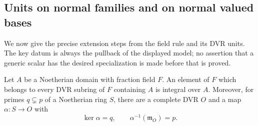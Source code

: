 \subsection{Units on normal families and on normal valued bases}
\label{subsec:ftb-key-normal-family-units}

We now give the precise extension steps from the field rule and
its DVR units.  The key datum is always the pullback of the
displayed model; no assertion that a generic scalar has the
desired specialization is made before that is proved.

\begin{srlemma}
\label{lem:ftb-key-dvr-tests}
Let \(A\) be a Noetherian domain with fraction field \(F\).
An element of \(F\) which belongs to every DVR subring of \(F\)
containing \(A\) is integral over \(A\).
Moreover, for primes \(q\subsetneq p\) of a Noetherian ring \(S\),
there are a complete DVR \(O\) and a map \(\alpha:S\to O\) with
\[
                 \ker\alpha=q,\qquad
                 \alpha^{-1}(\mathfrak m_O)=p.
 \tag{U1}\label{eq:ftb-key-dvr-specialization-test}
\]
\end{srlemma}
